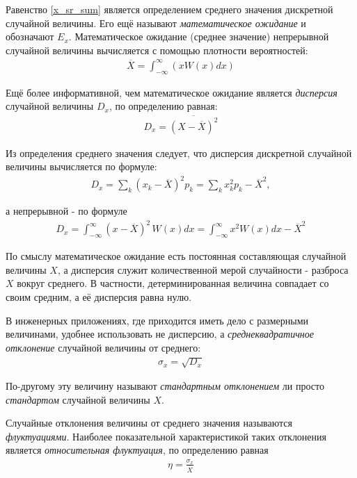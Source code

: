  Равенство \eqref{x_sr_sum} является определением среднего значения дискретной случайной величины. Его ещё называют \textit{математическое ожидание} и обозначают $E_x$.
 Математическое ожидание (среднее значение) непрерывной случайной величины вычисляется с помощью плотности вероятностей:
  \begin{align*} \tag{12b} \label{x_sr_int}
 	\overline X = \int_{ -\infty }^{ \infty } (x W(x) dx)
 \end{align*}
 
 Ещё более информативной, чем математическое ожидание является \textit{дисперсия} случайной величины $D_x$, по определению равная:
 \begin{align} \label{13}
 	D_x = \overline{(X - \overline{X})^2}
 \end{align}

Из определения среднего значения следует, что дисперсия дискретной случайной величины вычисляется по формуле:
\begin{align} \tag{13a}
	D_x = \sum_{k} { (x_k - \overline{X})^2 p_k } = \sum_{k} { x_k^2 p_k - \overline{X}^2 },
\end{align}

а непрерывной - по формуле
\begin{align} \tag{13b}
	D_x = \int_{-\infty}^{\infty} { (x - \overline{X})^2 \, W(x) dx } = \int_{-\infty}^{\infty} { x^2 W(x) dx } - \overline{X}^2
\end{align}

По смыслу математическое ожидание есть постоянная составляющая случайной величины $X$, а дисперсия служит количественной мерой случайности - разброса $X$ вокруг среднего. В частности, детерминированная величина совпадает со своим средним, а её дисперсия равна нулю.

В инженерных приложениях, где приходится иметь дело с размерными величинами, удобнее использовать не дисперсию, а \textit{среднеквадратичное отклонение} случайной величины от среднего:
\begin{align}
	\sigma_x = \sqrt{D_x}
\end{align}

По-другому эту величину называют \textit{стандартным отклонением} ли просто \textit{стандартом} случайной величины $X$.

Случайные отклонения величины от среднего значения называются \textit{флуктуациями}. Наиболее показательной характеристикой таких отклонения является \textit{относительная флуктуация}, по определению равная
\begin{align}
	\eta = \frac{\sigma_x}{\overline{X}}
\end{align}

